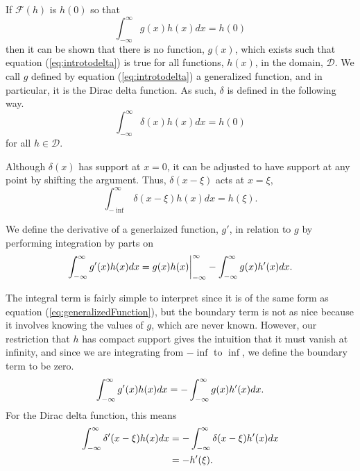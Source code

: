If \(\mathcal{F}(h)\) is \(h(0)\) so that
\begin{equation}\label{eq:introtodelta}
    \int_{-\infty}^{\infty}g(x)h(x) dx=h(0)
\end{equation}
then it can be shown that there is no function, \(g(x)\), which exists such that equation (\ref{eq:introtodelta}) is true for all functions, \(h(x)\), in the domain, \(\mathcal{D}\). We call \(g\) defined by equation (\ref{eq:introtodelta}) a generalized function, and in particular, it is the Dirac delta function. As such, \(\delta\) is defined in the following way.
\begin{equation}\label{eq:deltadef}
    \int_{-\infty}^{\infty} \delta(x)h(x) dx = h(0)
\end{equation}
for all \(h\in \mathcal{D}\).

Although \(\delta(x)\) has support at \(x=0\), it can be adjusted to have support at any point by shifting the argument. Thus, \(\delta(x-\xi)\) acts at \(x=\xi\),
\begin{equation}
    \int_{-\inf}^{\infty} \delta(x-\xi)h(x)dx = h(\xi).
\end{equation}

\begin{definition}
    We define the derivative of a generlaized function, \(g'\), in relation to \(g\) by performing integration by parts on
    \begin{equation}
            \int_{-\infty}^{\infty} g'(x)h(x) dx= g(x)h(x)\biggr\rvert_{-\infty}^{\infty} - \int_{-\infty}^{\infty} g(x)h'(x)dx.
    \end{equation}
\end{definition}
The integral term is fairly simple to interpret since it is of the same form as equation (\ref{eq:generalizedFunction}), but the boundary term is not as nice because it involves knowing the values of \(g\), which are never known. However, our restriction that \(h\) has compact support gives the intuition that it must vanish at infinity, and since we are integrating from \(-\inf\) to \(\inf\), we define the boundary term to be zero.
\begin{equation}
    \int_{-\infty}^{\infty} g'(x)h(x)dx = -\int_{-\infty}^{\infty} g(x)h'(x)dx.
\end{equation}
For the Dirac delta function, this means
\begin{equation}
    \begin{split} \label{eq:deltafirst}
        \int_{-\infty}^{\infty} \delta'(x-\xi)h(x)dx &= -\int_{-\infty}^{\infty}\delta(x-\xi)h'(x)dx\\
        &=-h'(\xi).
    \end{split}
\end{equation}


